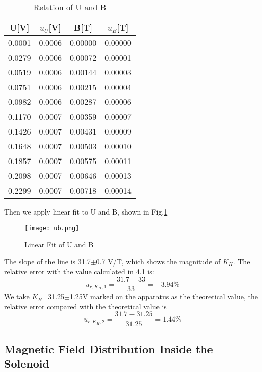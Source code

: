 \documentclass[12pt,a4paper]{article}
\begin{document}
\begin{table}[H]
    \centering
    \begin{tabular}{|c|c|c|c|}
    \hline
    U[V] & $u_U$[V]  & B[T]  &  $u_B$[T]  \\ \hline
    0.0001 & 0.0006 & 0.00000 & 0.00000 \\ \hline
    0.0279 & 0.0006 & 0.00072 & 0.00001 \\ \hline
    0.0519 & 0.0006 & 0.00144 & 0.00003 \\ \hline
    0.0751 & 0.0006 & 0.00215 & 0.00004 \\ \hline
    0.0982 & 0.0006 & 0.00287 & 0.00006 \\ \hline
    0.1170 & 0.0007 & 0.00359 & 0.00007 \\ \hline
    0.1426 & 0.0007 & 0.00431 & 0.00009 \\ \hline
    0.1648 & 0.0007 & 0.00503 & 0.00010 \\ \hline
    0.1857 & 0.0007 & 0.00575 & 0.00011 \\ \hline
    0.2098 & 0.0007 & 0.00646 & 0.00013 \\ \hline
    0.2299 & 0.0007 & 0.00718 & 0.00014 \\ \hline
    \end{tabular}
    \caption{Relation of U and B}
    \label{imb}
\end{table}

Then we apply linear fit to U and B, shown in Fig.\ref{imbfig}

\begin{figure}[h]
    \centering
    \texttt{[image: ub.png]}
    \caption{Linear Fit of U and B}
    \label{imbfig}
\end{figure}

The slope of the line is 31.7$\pm$0.7 V/T, which shows the magnitude of $K_H$. The relative error with the value calculated in 4.1 is:
$$u_{r,K_H,1}=\frac{31.7-33}{33}=-3.94\%$$
We take $K_H$=31.25$\pm$1.25V marked on the apparatus as the theoretical value, the relative error compared with the theoretical value is 
$$u_{r,K_H,2}=\frac{31.7-31.25}{31.25}=1.44\%$$

\subsection{ Magnetic Field Distribution Inside the Solenoid}
\end{document}
